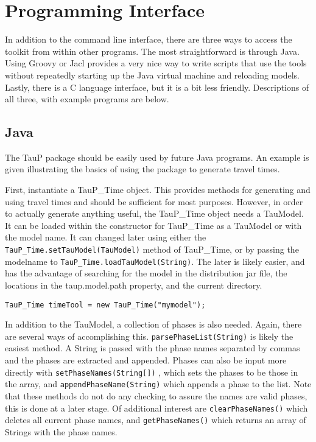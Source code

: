
\section{Programming Interface}

In addition to the command line interface, there are three ways to access
the toolkit from within other programs. The most straightforward is
through Java. Using Groovy or Jacl provides a very nice way to write scripts that
use the tools without repeatedly starting up the Java virtual machine and
reloading models. Lastly, there is a C language interface, but it is
a bit less friendly. Descriptions of all three, with example programs
are below.

\subsection{Java}

The TauP package should be easily used by future Java programs. An
example is given illustrating the basics of using the package to
generate travel times.

First, instantiate a TauP\_Time object. This provides methods for
generating and
using travel times and should be sufficient for most purposes.
However, in order to actually generate anything useful, the TauP\_Time
object needs a TauModel. It can be loaded within the constructor for TauP\_Time
as a TauModel or with the model name.
It can changed later using either the \texttt{TauP\_Time.setTauModel(TauModel)} method of
TauP\_Time, or by passing the modelname to \texttt{TauP\_Time.loadTauModel(String)}.
The later is likely easier, and has the advantage of searching for the model in
the distribution jar file, the locations in the taup.model.path property,
and the current directory.

\texttt{TauP\_Time timeTool = new TauP\_Time("mymodel");}

In addition to the TauModel, a collection of phases is also needed. Again,
there are several ways of accomplishing this.
\texttt{parsePhaseList(String)} is likely the easiest method. A String is passed
with the phase names separated by commas and the phases are extracted and
appended. Phases can also be input more
directly with \texttt{setPhaseNames(String[])} ,
which sets the phases to be those in the array, and
\texttt{appendPhaseName(String)} which appends a phase to the list. Note that
these methods do not do any checking to assure the names are valid phases,
this is done at a later stage. Of additional interest are
\texttt{clearPhaseNames()} which deletes all current phase names, and
\texttt{getPhaseNames()} which returns an array of Strings with the phase names.


